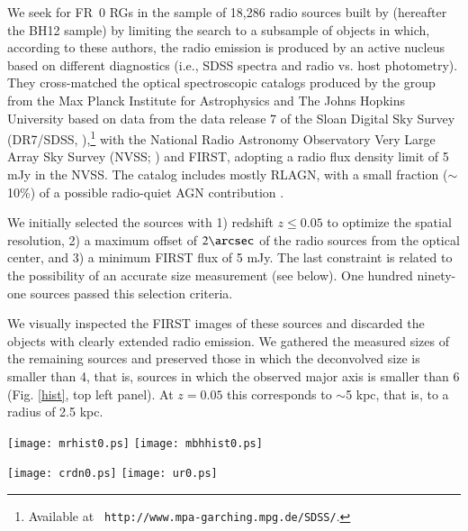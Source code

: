 \documentclass[traditabstract]{aa}
\newcommand{\FR}{FRI{\sl{CAT}}}\newcommand{\FRII}{FRII{\sl{CAT}}}
\newcommand{\FRo}{FR0{\sl{CAT}}}
\newcommand{\sFR}{sFRI{\sl{CAT}}}
\begin{document}
We seek for FR~0 RGs in the sample of 18,286 radio sources built
by \citet{best12} (hereafter the BH12 sample) by limiting the search
to a subsample of objects in which, according to these authors, the
radio emission is produced by an active nucleus based on different
diagnostics (i.e., SDSS spectra and radio vs. host photometry). They
cross-matched the optical spectroscopic catalogs produced by the group
from the Max Planck Institute for Astrophysics and The Johns Hopkins
University \citep{bri04,tre04} based on data from the data release 7
of the Sloan Digital Sky Survey (DR7/SDSS,
\citealt{abazajian09}),\footnote{Available at {\tt
    http://www.mpa-garching.mpg.de/SDSS/}.} with the National Radio
Astronomy Observatory Very Large Array Sky Survey (NVSS;
\citealt{condon98}) and FIRST, adopting a radio flux density limit of
5 mJy in the NVSS. The catalog includes mostly RLAGN, with a small
fraction ($\sim$10\%) of a possible radio-quiet AGN contribution
\citep{baldi10b}.

We initially selected the sources with 1) redshift $z \leq 0.05$ to optimize
the spatial resolution, 2) a maximum offset of $2\arcsec$ of the radio sources
from the optical center, and 3) a minimum FIRST flux of 5 mJy. The last
constraint is related to the possibility of an accurate size measurement (see
below). One hundred ninety-one sources passed this selection criteria.

We visually inspected the FIRST images of these sources and discarded
the objects with clearly extended radio emission. We gathered the
measured sizes of the remaining sources and preserved those in which the
deconvolved size is smaller than 4\arcsec, that is, sources in which the observed
major axis is smaller than 6 (Fig. \ref{hist}, top left
panel). At $z=0.05$ this corresponds to $\sim$5 kpc, that is, to a radius
of 2.5 kpc.

\begin{figure*}
\texttt{[image: mrhist0.ps]}
\texttt{[image: mbhhist0.ps]}
\caption{Distributions of the $r$ -band absolute magnitude (left) and black
  hole masses (right). The \FR\ histograms are all scaled by the relative
  number of FR~I and FR~0, that is, by 108/219. Colors as in Fig. \ref{hist}.}
\label{mhist}
\end{figure*}

\begin{figure*}
\texttt{[image: crdn0.ps]}
\texttt{[image: ur0.ps]}
\caption{Left panel: concentration index $C_r$ vs Dn(4000) index;
  right panel: absolute $r$-band magnitude, $M_r$, vs. $u-r$ color of the
  \FRo\ (blue), \FR\ (black), and \sFR\ (red) sources. The green histogram on
  the bottom shows the percentage of blue ETGs (scale on the right axis) from
  \citet{schawinski09}. The dashed line separates the blue ETGs from the
  red sequence, following their definition. Colors as in Fig. \ref{hist}.}
\label{crdn}
\end{figure*}
\end{document}
